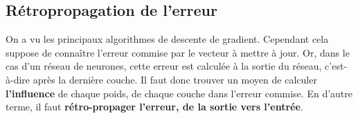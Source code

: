 \subsection{Rétropropagation de l'erreur}

On a vu les principaux algorithmes de descente de gradient. Cependant cela suppose de connaître l'erreur commise par le vecteur à mettre à jour. Or, dans le cas d'un réseau de neurones, cette erreur est calculée à la sortie du réseau, c'est-à-dire après la dernière couche. Il faut donc trouver un moyen de calculer \textbf{l'influence} de chaque poids, de chaque couche dans l'erreur commise. En d'autre terme, il faut \textbf{rétro-propager l'erreur, de la sortie vers l'entrée}.













